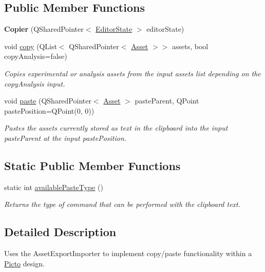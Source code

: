 \subsection*{Public Member Functions}
\begin{DoxyCompactItemize}
\item 
\hypertarget{class_copier_ad38e60f47370f7367c63dcadb0ea46d4}{{\bfseries Copier} (Q\-Shared\-Pointer$<$ \hyperlink{class_editor_state}{Editor\-State} $>$ editor\-State)}\label{class_copier_ad38e60f47370f7367c63dcadb0ea46d4}

\item 
void \hyperlink{class_copier_a48f1c6d5c6f49438f7c7b870b3151490}{copy} (Q\-List$<$ Q\-Shared\-Pointer$<$ \hyperlink{class_picto_1_1_asset}{Asset} $>$$>$ assets, bool copy\-Analysis=false)
\begin{DoxyCompactList}\small\item\em Copies experimental or analysis assets from the input assets list depending on the copy\-Analysis input. \end{DoxyCompactList}\item 
void \hyperlink{class_copier_a6a6988c2aac1c00888200f9f1c63e0c4}{paste} (Q\-Shared\-Pointer$<$ \hyperlink{class_picto_1_1_asset}{Asset} $>$ paste\-Parent, Q\-Point paste\-Position=Q\-Point(0, 0))
\begin{DoxyCompactList}\small\item\em Pastes the assets currently stored as text in the clipboard into the input paste\-Parent at the input paste\-Position. \end{DoxyCompactList}\end{DoxyCompactItemize}
\subsection*{Static Public Member Functions}
\begin{DoxyCompactItemize}
\item 
static int \hyperlink{class_copier_a92fab45e23367d949b36497b5ee7dc0c}{available\-Paste\-Type} ()
\begin{DoxyCompactList}\small\item\em Returns the type of command that can be performed with the clipboard text. \end{DoxyCompactList}\end{DoxyCompactItemize}


\subsection{Detailed Description}
Uses the Asset\-Export\-Importer to implement copy/paste functionality within a \hyperlink{namespace_picto}{Picto} design. 

